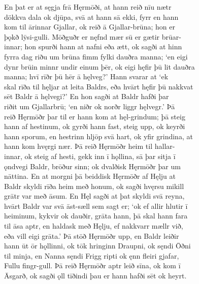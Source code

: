 \documentclass[12pt,letterpaper]{book}
\begin{document}
\begin{linenumbers}
En þat er at sęgja frā Hęrmōði, at hann reið nīu nætr\\
dökkva dala ok djūpa, svā at hann sā ekki, fyrr en hann\\
kom til ārinnar Gjallar, ok reið ā Gjallar-brūna; hon er\\
þǫkð lȳsi-gulli.  Mōðguðr er nęfnd mær sū er gætir brūar-\\
innar; hon spurði hann at nafni eða ætt, ok sagði at hinn\\
fyrra dag riðu um brūna fimm fylki dauðra manna; `en eigi\\
dynr brūin minnr undir einum þēr, ok eigi hęfir þū lit dauðra\\
manna; hvī rīðr þū hēr ā hęlveg?'  Hann svarar at `ek\\
skal rīða til hęljar at leita Baldrs, eða hvārt hęfir þū nakkvat\\
sēt Baldr ā hęlvegi?'  En hon sagði at Baldr hafði þar\\
riðit um Gjallarbrū; `en niðr ok norðr liggr hęlvegr.'  Þā\\
reið Hęrmōðr þar til er hann kom at hęl-grindum; þā steig\\
hann af hestinum, ok gyrði hann fast, steig upp, ok keyrði\\
hann sporum, en hestrinn hljōp svā hart, ok yfir grindina, at\\
hann kom hvęrgi nær.  Þā reið Hęrmōðr heim til hallar-\\
innar, ok steig af hesti, gekk inn ī hǫllina, sā þar sitja ī\\
ǫndvegi Baldr, brōður sinn; ok dvalðisk Hęrmōðr þar um\\
nāttina.  En at morgni þā beiddisk Hęrmōðr af Hęlju at\\
Baldr skyldi rīða heim með honum, ok sagði hvęrsu mikill\\
grātr var með āsum.  En Hęl sagði at þat skyldi svā reyna,\\
hvārt Baldr var svā āst-sæll sem sagt er; `ok ef allir hlutir ī\\
heiminum, kykvir ok dauðir, grāta hann, þā skal hann fara\\
til āsa aptr, en haldask með Hęlju, ef nakkvarr mællr við,\\
eða vill eigi grāta.'  Þā stōð Hęrmōðr upp, en Baldr leiðir\\
hann ūt ōr hǫllinni, ok tōk hringinn Draupni, ok sęndi Ōðni\\
til minja, en Nanna sęndi Frigg ripti ok ęnn fleiri gjafar,\\
Fullu fingr-gull.  Þā reið Hęrmōðr aptr leið sīna, ok kom ī\\
Āsgarð, ok sagði ǫll tīðindi þau er hann hafði sēt ok heyrt.


\end{linenumbers}
\end{document}
